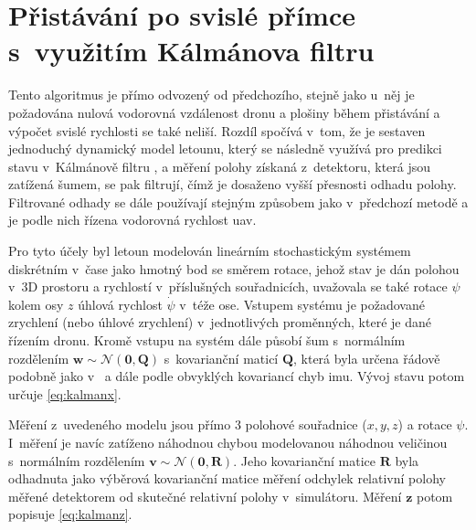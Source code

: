     \section{Přistávání po svislé přímce s~využitím Kálmánova filtru} \label{sec:kalmanoffboardpid}
        Tento algoritmus je přímo odvozený od předchozího, stejně jako u~něj je požadována nulová vodorovná vzdálenost dronu a plošiny během přistávání a výpočet svislé rychlosti se také neliší. Rozdíl spočívá v~tom, že je sestaven jednoduchý dynamický model letounu, který se následně využívá pro predikci stavu v~Kálmánově filtru \cite{Kalman1960}, \cite{Kalman1961} a měření polohy získaná z~detektoru, která jsou zatížená šumem, se pak filtrují, čímž je dosaženo vyšší přesnosti odhadu polohy. Filtrované odhady se dále používají stejným způsobem jako v~předchozí metodě a je podle nich řízena vodorovná rychlost \acrshort{uav}.

        Pro tyto účely byl letoun modelován lineárním stochastickým systémem diskrétním v~čase jako hmotný bod se směrem rotace, jehož stav je dán polohou v~3D prostoru a rychlostí v~příslušných souřadnicích, uvažovala se také rotace $\psi$ kolem osy $z$ úhlová rychlost $\dot \psi$ v~téže ose. Vstupem systému je požadované zrychlení (nebo úhlové zrychlení) v~jednotlivých proměnných, které je dané řízením dronu. Kromě vstupu na systém dále působí šum s~normálním rozdělením $\mathbf{w} \sim \mathcal{N}(\mathbf{0},\mathbf{Q})$ s~kovarianční maticí $\mathbf{Q}$, která byla určena řádově podobně jako v~\cite{Kojima2015} a dále podle obvyklých kovariancí chyb \acrshort{imu}. %
        Vývoj stavu potom určuje \cref{eq:kalmanx}.

        Měření z~uvedeného modelu jsou přímo 3 polohové souřadnice ($x, y, z$) a rotace $\psi$. I~měření je navíc zatíženo náhodnou chybou modelovanou náhodnou veličinou s~normálním rozdělením $\mathbf{v} \sim \mathcal{N}(\mathbf{0},\mathbf{R})$. Jeho kovarianční matice $\mathbf{R}$ byla odhadnuta jako výběrová kovarianční matice měření odchylek relativní polohy měřené detektorem od skutečné relativní polohy v~simulátoru. Měření $\mathbf z$ potom popisuje \cref{eq:kalmanz}.

